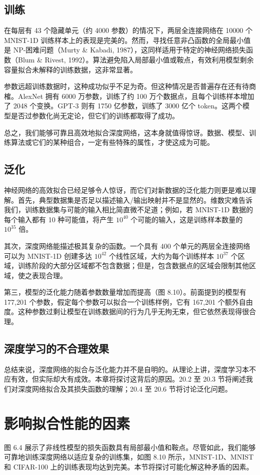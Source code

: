 \documentclass[lang=cn,newtx,10pt,scheme=chinese]{elegantbook}
\begin{document}
\subsection{训练}
在每层有 43 个隐藏单元（约 4000 参数）的情况下，两层全连接网络在 10000 个 MNIST-1D 训练样本上的表现是完美的。然而，寻找任意非凸函数的全局最小值是 NP-困难问题（Murty \& Kabadi, 1987），这同样适用于特定的神经网络损失函数（Blum \& Rivest, 1992）。算法避免陷入局部最小值或鞍点，有效利用模型剩余容量拟合未解释的训练数据，这非常显著。

参数远超训练数据时，这种成功似乎不足为奇。但这种情况是否普遍存在还有待商榷。AlexNet 拥有 6000 万参数，训练了约 100 万个数据点，且每个训练样本增加了 2048 个变换。GPT-3 则有 1750 亿参数，训练了 3000 亿个 token。这两个模型是否过参数化尚无定论，但它们的训练都取得了成功。

总之，我们能够可靠且高效地拟合深度网络，这本身就值得惊讶。数据、模型、训练算法或它们的某种组合，一定有些特殊的属性，才使这成为可能。

\subsection{泛化}
神经网络的高效拟合已经足够令人惊讶，而它们对新数据的泛化能力则更是难以理解。首先，典型数据集是否足以描述输入/输出映射并不是显然的。维数灾难告诉我们，训练数据集与可能的输入相比简直微不足道；例如，若 MNIST-1D 数据的每个输入都有 10 种可能值，将产生 \(10^40\) 个可能的输入，这是训练样本数量的 \(10^35\) 倍。

其次，深度网络能描述极其复杂的函数。一个具有 400 个单元的两层全连接网络可以为 MNIST-1D 创建多达 \(10^42\) 个线性区域，大约为每个训练样本 \(10^37\) 个区域，训练阶段的大部分区域都不包含数据；但是，包含数据点的区域会限制其他区域，使之表现合理。

第三，模型的泛化能力随着参数数量增加而提高（图 8.10）。前面提到的模型有 177,201 个参数，假定每个参数可以拟合一个训练样例，它有 167,201 个额外自由度。这种参数过剩让模型在训练数据间的行为几乎无拘无束，但它依然表现得很合理。

\subsection{深度学习的不合理效果}
总结来说，深度网络的拟合与泛化能力并不是自明的。从理论上讲，深度学习本不应有效，但实际却大有成效。本章将探讨这背后的原因。20.2 至 20.3 节将阐述我们对深度网络拟合及其损失函数的理解；20.4 至 20.6 节将讨论泛化问题。

\section{影响拟合性能的因素}
图 6.4 展示了非线性模型的损失函数具有局部最小值和鞍点。尽管如此，我们能够可靠地训练深度网络以适应复杂的训练集，如图 8.10 所示，MNIST-1D、MNIST 和 CIFAR-100 上的训练表现均达到完美。本节将探讨可能化解这种矛盾的因素。
\end{document}
